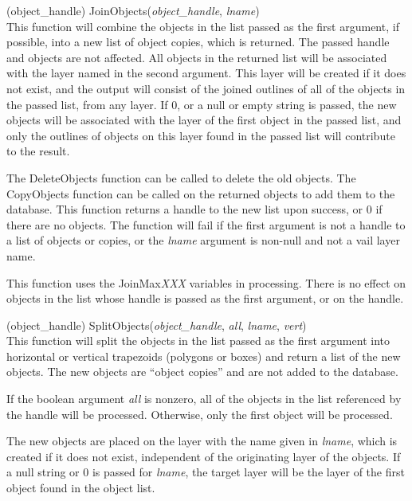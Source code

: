 \begin{description}
\item{(object\_handle) \vt JoinObjects({\it object\_handle}, {\it lname\/})}\\
This function will combine the objects in the list passed as the first
argument, if possible, into a new list of object copies, which is
returned.  The passed handle and objects are not affected.  All
objects in the returned list will be associated with the layer named
in the second argument.  This layer will be created if it does not
exist, and the output will consist of the joined outlines of all of
the objects in the passed list, from any layer.  If 0, or a null or
empty string is passed, the new objects will be associated with the
layer of the first object in the passed list, and only the outlines of
objects on this layer found in the passed list will contribute to the
result.

The {\vt DeleteObjects} function can be called to delete the old
objects.  The {\vt CopyObjects} function can be called on the returned
objects to add them to the database.  This function returns a handle
to the new list upon success, or 0 if there are no objects.  The
function will fail if the first argument is not a handle to a list of
objects or copies, or the {\it lname} argument is non-null and not a
vail layer name.

This function uses the {\et JoinMax}{\it XXX} variables in processing. 
There is no effect on objects in the list whose handle is passed as
the first argument, or on the handle.

\item{(object\_handle) \vt SplitObjects({\it object\_handle}, {\it all\/},
 {\it lname}, {\it vert\/})}\\
This function will split the objects in the list passed as the first
argument into horizontal or vertical trapezoids (polygons or boxes)
and return a list of the new objects.  The new objects are ``object
copies'' and are not added to the database.

If the boolean argument {\it all} is nonzero, all of the objects in
the list referenced by the handle will be processed.  Otherwise, only
the first object will be processed.

The new objects are placed on the layer with the name given in {\it
lname}, which is created if it does not exist, independent of the
originating layer of the objects.  If a null string or 0 is passed for
{\it lname}, the target layer will be the layer of the first object
found in the object list.


\end{description}
